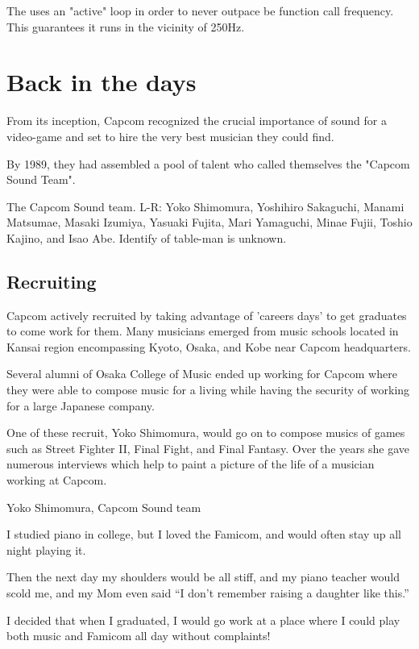 The  uses an "active" loop in order to never outpace be  function call frequency. This guarantees it runs in the vicinity of 250Hz. 





\section{Back in the days}
From its inception, Capcom recognized the crucial importance of sound for a video-game and set to hire the very best musician they could find.

By 1989, they had assembled a pool of talent who called themselves the "Capcom Sound Team".


The Capcom Sound team. L-R: Yoko Shimomura, Yoshihiro Sakaguchi, Manami Matsumae, Masaki Izumiya, Yasuaki Fujita, Mari Yamaguchi, Minae Fujii, Toshio Kajino, and Isao Abe. Identify of table-man is unknown.

\subsection{Recruiting}
Capcom actively recruited by taking advantage of 'careers days' to get graduates to come work for them. Many musicians emerged from music schools located in Kansai region encompassing Kyoto, Osaka, and Kobe near Capcom headquarters. 

Several alumni of Osaka College of Music ended up working for Capcom where they were able to compose music for a living while having the security of working for a large Japanese company. 





One of these recruit, Yoko Shimomura, would go on to compose musics of games such as Street Fighter II, Final Fight, and Final Fantasy. Over the years she gave numerous interviews which help to paint a picture of the life of a musician working at Capcom.


\begin{q}{Yoko Shimomura, Capcom Sound team\cite{beep199010}}

I studied piano in college, but I loved the Famicom, and would often stay up all night playing it. 

Then the next day my shoulders would be all stiff, and my piano teacher would scold me, and my Mom even said “I don’t remember raising a daughter like this.”

I decided that when I graduated, I would go work at a place where I could play both music and Famicom all day without complaints!
\end{q}


